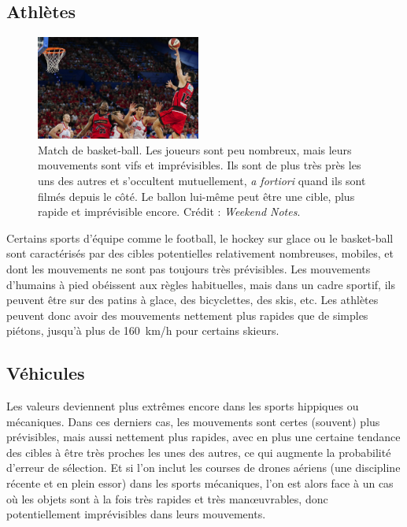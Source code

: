 	\subsection{Athlètes}
	
	\begin{figure}
		\centering
		\includegraphics[width=0.48\textwidth]{figures/ch1/basket}
		\caption[Match de basket-ball.]{Match de basket-ball. Les joueurs sont peu nombreux, mais leurs mouvements sont vifs et imprévisibles. Ils sont de plus très près les uns des autres et s'occultent mutuellement, \emph{a fortiori} quand ils sont filmés depuis le côté. Le ballon lui-même peut être une cible, plus rapide et imprévisible encore. Crédit : \emph{Weekend Notes}\footnotemark.}
		\label{fig:basketball}
	\end{figure}
	
	
	Certains sports d'équipe comme le football, le hockey sur glace ou le basket-ball sont caractérisés par des cibles potentielles relativement nombreuses, mobiles, et dont les mouvements ne sont pas toujours très prévisibles. Les mouvements d'humains à pied obéissent aux règles habituelles, mais dans un cadre sportif, ils peuvent être sur des patins à glace, des bicyclettes, des skis, etc. Les athlètes peuvent donc avoir des mouvements nettement plus rapides que de simples piétons, jusqu'à plus de 160~km/h pour certains skieurs\footnotemark.
	
	
	\subsection{Véhicules}
	Les valeurs deviennent plus extrêmes encore dans les sports hippiques ou mécaniques. Dans ces derniers cas, les mouvements sont certes (souvent) plus prévisibles, mais aussi nettement plus rapides, avec en plus une certaine tendance des cibles à être très proches les unes des autres, ce qui augmente la probabilité d'erreur de sélection. Et si l'on inclut les courses de drones aériens\footnotemark{} (une discipline récente et en plein essor) dans les sports mécaniques, l'on est alors face à un cas où les objets sont à la fois très rapides et très manœuvrables, donc potentiellement imprévisibles dans leurs mouvements.
	
